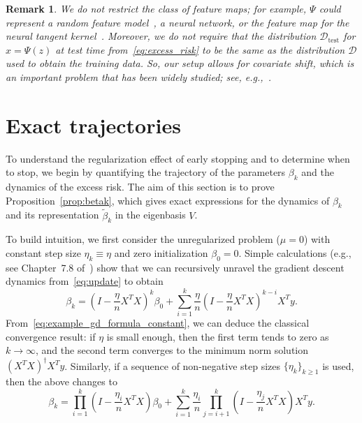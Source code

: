 \documentclass[11pt]{article}
\newtheorem{remark}{Remark}
\begin{document}
\begin{remark}
We do not restrict the class of feature maps; for example, $\Psi$ could represent a random feature model~\cite{RahimiRecht2007}, a neural network, or the feature map for the neural tangent kernel~\cite{jacot2018ntk}. Moreover, we do not require that the distribution $\mathcal{D}_{\mathrm{test}}$ for $x = \Psi(z)$ at test time from~\eqref{eq:excess_risk} to be the same as the distribution $\mathcal{D}$ used to obtain the training data. So, our setup allows for \emph{covariate shift}, which is an important problem that has been widely studied; see, e.g.,~\cite{tripuraneni2021covariate, kausiklowrank2024}.
\end{remark}


\section{Exact trajectories}
To understand the regularization effect of early stopping and to determine when to stop, we begin by quantifying the trajectory of the parameters $\beta_k$ and the dynamics of the excess risk. The aim of this section is to prove Proposition~\ref{prop:betak}, which gives exact expressions for the dynamics of $\beta_k$ and its representation $\tilde{\beta}_k$ in the eigenbasis $V$.

To build intuition, we first consider the unregularized problem ($\mu = 0$) with constant step size $\eta_k \equiv \eta$ and zero initialization $\beta_0 = 0$. Simple calculations (e.g., see Chapter~7.8 of~\cite{goodfellow2016deep}) show that we can recursively unravel the gradient descent dynamics from~\eqref{eq:update} to obtain
\begin{equation} \label{eq:example_gd_formula_constant}
    \beta_k = \left(I - \frac{\eta}{n}X^TX\right)^k\beta_0 + \sum_{i=1}^{k}\frac{\eta}{n}\left(I - \frac{\eta}{n}X^TX\right)^{k-i}X^Ty.
\end{equation}
From~\eqref{eq:example_gd_formula_constant}, we can deduce the classical convergence result: if $\eta$ is small enough, then the first term tends to zero as $k \to \infty$, and the second term converges to the minimum norm solution $(X^T X)^{\dagger} X^T y$. Similarly, if a sequence of non-negative step sizes $\{ \eta_k \}_{k \geq 1}$ is used, then the above changes to 
\begin{equation} \label{eq:example_gd_formula}
    \beta_k = \prod_{i=1}^k\left(I - \frac{\eta_i}{n}X^TX\right)\beta_0 + \sum_{i=1}^k \frac{\eta_i}{n}\prod_{j=i+1}^k \left(I - \frac{\eta_j}{n}X^TX\right) X^T y.
\end{equation}
\end{document}
